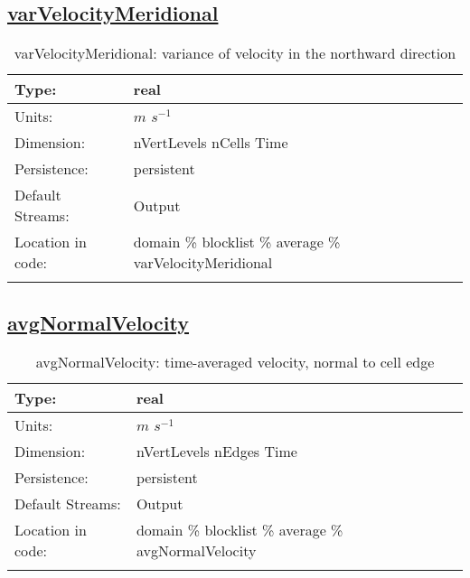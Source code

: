 \subsection[varVelocityMeridional]{\hyperref[sec:var_tab_average]{varVelocityMeridional}}
\label{subsec:var_sec_average_varVelocityMeridional}
\begin{center}
\begin{longtable}{| p{2.0in} | p{4.0in} |}
        \hline 
        Type: & real \\
        \hline 
        Units: & $m$ $s^{-1}$ \\
        \hline 
        Dimension: & nVertLevels nCells Time \\
        \hline 
        Persistence: & persistent \\
        \hline 
		 Default Streams: & Output  \\
        \hline 
		 Location in code: & domain \% blocklist \% average \% varVelocityMeridional \\
		 \hline 
    \caption{varVelocityMeridional: variance of velocity in the northward direction}
\end{longtable}
\end{center}
\subsection[avgNormalVelocity]{\hyperref[sec:var_tab_average]{avgNormalVelocity}}
\label{subsec:var_sec_average_avgNormalVelocity}
\begin{center}
\begin{longtable}{| p{2.0in} | p{4.0in} |}
        \hline 
        Type: & real \\
        \hline 
        Units: & $m$ $s^{-1}$ \\
        \hline 
        Dimension: & nVertLevels nEdges Time \\
        \hline 
        Persistence: & persistent \\
        \hline 
		 Default Streams: & Output  \\
        \hline 
		 Location in code: & domain \% blocklist \% average \% avgNormalVelocity \\
		 \hline 
    \caption{avgNormalVelocity: time-averaged velocity, normal to cell edge}
\end{longtable}
\end{center}
